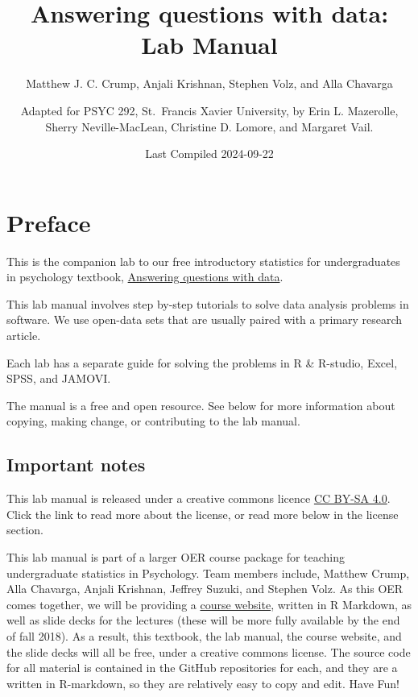 \documentclass[
]{book}
\title{Answering questions with data: Lab Manual}
\author{Matthew J. C. Crump, Anjali Krishnan, Stephen Volz, and Alla Chavarga \and Adapted for PSYC 292, St.~Francis Xavier University, by Erin L. Mazerolle, Sherry Neville-MacLean, Christine D. Lomore, and Margaret Vail.}
\date{Last Compiled 2024-09-22}
\begin{document}
\maketitle

{
\setcounter{tocdepth}{1}
\tableofcontents
}
\hypertarget{preface}{%
\chapter*{Preface}\label{preface}}

This is the companion lab to our free introductory statistics for undergraduates in psychology textbook, \href{https://www.erinmazerolle.com/statistics/}{Answering questions with data}.

This lab manual involves step by-step tutorials to solve data analysis problems in software. We use open-data sets that are usually paired with a primary research article.

Each lab has a separate guide for solving the problems in R \& R-studio, Excel, SPSS, and JAMOVI.

The manual is a free and open resource. See below for more information about copying, making change, or contributing to the lab manual.

\hypertarget{important-notes}{%
\section{Important notes}\label{important-notes}}

This lab manual is released under a creative commons licence \href{https://creativecommons.org/licenses/by-sa/4.0/}{CC BY-SA 4.0}. Click the link to read more about the license, or read more below in the license section.

This lab manual is part of a larger OER course package for teaching undergraduate statistics in Psychology. Team members include, Matthew Crump, Alla Chavarga, Anjali Krishnan, Jeffrey Suzuki, and Stephen Volz. As this OER comes together, we will be providing a \href{https://crumplab.github.io/psyc3400/}{course website}, written in R Markdown, as well as slide decks for the lectures (these will be more fully available by the end of fall 2018). As a result, this textbook, the lab manual, the course website, and the slide decks will all be free, under a creative commons license. The source code for all material is contained in the GitHub repositories for each, and they are a written in R-markdown, so they are relatively easy to copy and edit. Have Fun!
\end{document}
